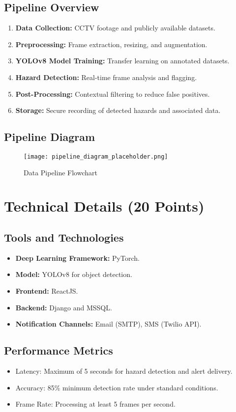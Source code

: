 \documentclass[12pt]{article}
\begin{document}
\subsection{Pipeline Overview}
\begin{enumerate}
    \item \textbf{Data Collection:} CCTV footage and publicly available datasets.
    \item \textbf{Preprocessing:} Frame extraction, resizing, and augmentation.
    \item \textbf{YOLOv8 Model Training:} Transfer learning on annotated datasets.
    \item \textbf{Hazard Detection:} Real-time frame analysis and flagging.
    \item \textbf{Post-Processing:} Contextual filtering to reduce false positives.
    \item \textbf{Storage:} Secure recording of detected hazards and associated data.
\end{enumerate}

\subsection{Pipeline Diagram}
\begin{figure}[h]
    \centering
    \texttt{[image: pipeline\_diagram\_placeholder.png]}
    \caption{Data Pipeline Flowchart}
    \label{fig:pipeline}
\end{figure}

\section{Technical Details (20 Points)}
\subsection{Tools and Technologies}
\begin{itemize}
    \item \textbf{Deep Learning Framework:} PyTorch.
    \item \textbf{Model:} YOLOv8 for object detection.
    \item \textbf{Frontend:} ReactJS.
    \item \textbf{Backend:} Django and MSSQL.
    \item \textbf{Notification Channels:} Email (SMTP), SMS (Twilio API).
\end{itemize}

\subsection{Performance Metrics}
\begin{itemize}
    \item Latency: Maximum of 5 seconds for hazard detection and alert delivery.
    \item Accuracy: 85\% minimum detection rate under standard conditions.
    \item Frame Rate: Processing at least 5 frames per second.
\end{itemize}
\end{document}
